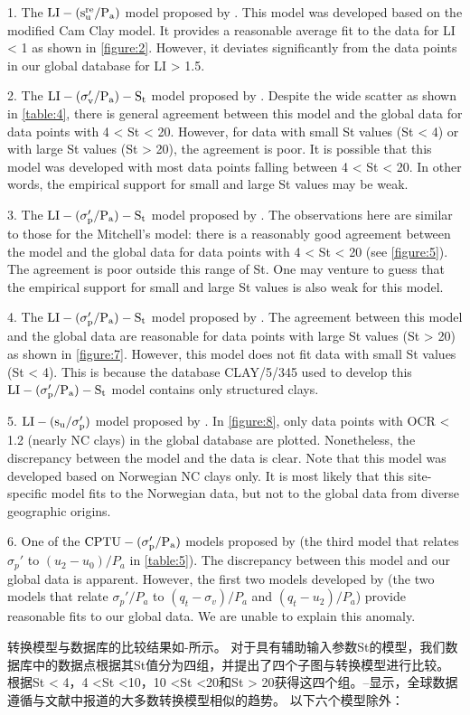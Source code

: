 \begin{Parallel}{0.60\textwidth}{}
{        1. The $\rm{LI}-(s_u^{re}/P_a)$ model proposed by \citet{Wroth1978137}. This model was developed based on the modified Cam Clay model. It provides a reasonable average fit to the data for LI < 1 as shown in \autoref{figure:2}. However, it deviates significantly from the data points in our global database for LI > 1.5.

        2. The $\rm{LI}-(\sigma_v'/P_a)-S_t$ model proposed by \citet{Mitchell1993}. Despite the wide scatter as shown in \autoref{table:4}, there is general agreement between this model and the global data for data points with 4 < St < 20. However, for data with small St values (St < 4) or with large St values (St > 20), the agreement is poor. It is possible that this model was developed with most data points falling between 4 < St < 20. In other words, the empirical support for small and large St values may be weak.

        3. The $\rm{LI}-(\sigma_p'/P_a)-S_t$ model proposed by \citet{NAVFAC1982}. The observations here are similar to those for the Mitchell’s model: there is a reasonably good agreement between the model and the global data for data points with 4 < St < 20 (see \autoref{figure:5}). The agreement is poor outside this range of St. One may venture to guess that the empirical support for small and large St values is also weak for this model.

        4. The $\rm{LI}-(\sigma_p'/P_a)-S_t$ model proposed by \citet{Ching2012522}. The agreement between this model and the global data are reasonable for data points with large St values (St > 20) as shown in \autoref{figure:7}. However, this model does not fit data with small St values (St < 4). This is because the database CLAY/5/345 used to develop this $\rm{LI}-(\sigma_p'/P_a)-S_t$ model contains only structured clays.

        5. $\rm{LI}-(s_u/\sigma_p')$ model proposed by \citet{Bjerrum1960711}. In \autoref{figure:8}, only data points with OCR < 1.2 (nearly NC clays) in the global database are plotted. Nonetheless, the discrepancy between the model and the data is clear. Note that this model was developed based on Norwegian NC clays only. It is most likely that this site-specific model fits to the Norwegian data, but not to the global data from diverse geographic origins.
        
        6. One of the $\rm{CPTU}-(\sigma_p'/P_a)$ models proposed by \citet{Chen1996488} (the third model that relates $\sigma_p'$ to $(u_2-u_0)/P_a$ in \autoref{table:5}). The discrepancy between this model and our global data is apparent. However, the first two models developed by \citet{Chen1996488} (the two models that relate $\sigma_p'/P_a$ to $(q_t-\sigma_v)/P_a$ and $(q_t-u_2)/P_a$) provide reasonable fits to our global data. We are unable to explain this anomaly.
    }
    \ParallelRText
    {
        转换模型与数据库的比较结果如-所示。 对于具有辅助输入参数St的模型，我们数据库中的数据点根据其St值分为四组，并提出了四个子图与转换模型进行比较。 根据St < 4，4 <St <10，10 <St <20和St > 20获得这四个组。–显示，全球数据遵循与文献中报道的大多数转换模型相似的趋势。 以下六个模型除外：

}
\end{Parallel}
